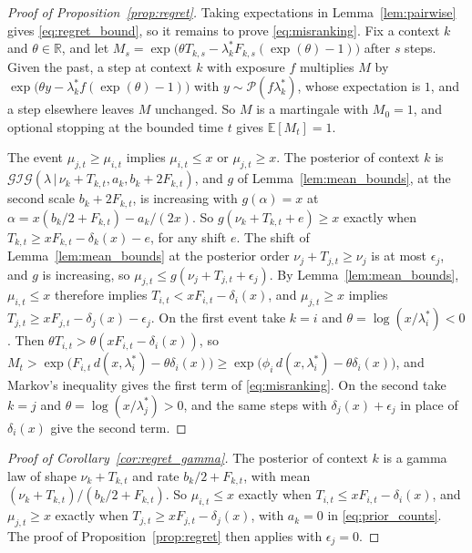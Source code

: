 \documentclass[twoside]{article}
\newcommand\given[1][]{\,#1\vert\,}
\providecommand{\Gig}{\mathcal{GIG}}  %
\theoremstyle{plain}
\theoremstyle{definition}
\theoremstyle{remark}
\begin{document}
\begin{proof}[Proof of Proposition~\ref{prop:regret}]
    Taking expectations in Lemma~\ref{lem:pairwise} gives \eqref{eq:regret_bound}, so it remains to prove \eqref{eq:misranking}.
    Fix a context $k$ and $\theta \in \mathbb{R}$, and let $M_s = \exp\big(\theta T_{k,s} - \lambda^{*}_k F_{k,s} (\exp(\theta) - 1)\big)$ after $s$ steps.
    Given the past, a step at context $k$ with exposure $f$ multiplies $M$ by $\exp\big(\theta y - \lambda^{*}_k f (\exp(\theta) - 1)\big)$ with $y \sim \mathcal{P}(f \lambda^{*}_k)$, whose expectation is $1$, and a step elsewhere leaves $M$ unchanged.
    So $M$ is a martingale with $M_0 = 1$, and optional stopping at the bounded time $t$ gives $\mathbb{E}[M_t] = 1$.

    The event $\mu_{j,t} \geq \mu_{i,t}$ implies $\mu_{i,t} \leq x$ or $\mu_{j,t} \geq x$.
    The posterior of context $k$ is $\Gig(\lambda \given \nu_k + T_{k,t}, a_k, b_k + 2 F_{k,t})$, and $g$ of Lemma~\ref{lem:mean_bounds}, at the second scale $b_k + 2 F_{k,t}$, is increasing with $g(\alpha) = x$ at $\alpha = x (b_k / 2 + F_{k,t}) - a_k / (2x)$.
    So $g(\nu_k + T_{k,t} + e) \geq x$ exactly when $T_{k,t} \geq x F_{k,t} - \delta_k(x) - e$, for any shift $e$.
    The shift of Lemma~\ref{lem:mean_bounds} at the posterior order $\nu_j + T_{j,t} \geq \nu_j$ is at most $\epsilon_j$, and $g$ is increasing, so $\mu_{j,t} \leq g(\nu_j + T_{j,t} + \epsilon_j)$.
    By Lemma~\ref{lem:mean_bounds}, $\mu_{i,t} \leq x$ therefore implies $T_{i,t} < x F_{i,t} - \delta_i(x)$, and $\mu_{j,t} \geq x$ implies $T_{j,t} \geq x F_{j,t} - \delta_j(x) - \epsilon_j$.
    On the first event take $k = i$ and $\theta = \log(x / \lambda^{*}_i) < 0$.
    Then $\theta T_{i,t} > \theta (x F_{i,t} - \delta_i(x))$, so $M_t > \exp\big(F_{i,t} \, d(x, \lambda^{*}_i) - \theta \delta_i(x)\big) \geq \exp\big(\phi_i \, d(x, \lambda^{*}_i) - \theta \delta_i(x)\big)$, and Markov's inequality gives the first term of \eqref{eq:misranking}.
    On the second take $k = j$ and $\theta = \log(x / \lambda^{*}_j) > 0$, and the same steps with $\delta_j(x) + \epsilon_j$ in place of $\delta_i(x)$ give the second term.
\end{proof}

\begin{proof}[Proof of Corollary~\ref{cor:regret_gamma}]
    The posterior of context $k$ is a gamma law of shape $\nu_k + T_{k,t}$ and rate $b_k / 2 + F_{k,t}$, with mean $(\nu_k + T_{k,t}) / (b_k / 2 + F_{k,t})$.
    So $\mu_{i,t} \leq x$ exactly when $T_{i,t} \leq x F_{i,t} - \delta_i(x)$, and $\mu_{j,t} \geq x$ exactly when $T_{j,t} \geq x F_{j,t} - \delta_j(x)$, with $a_k = 0$ in \eqref{eq:prior_counts}.
    The proof of Proposition~\ref{prop:regret} then applies with $\epsilon_j = 0$.
\end{proof}
\end{document}
